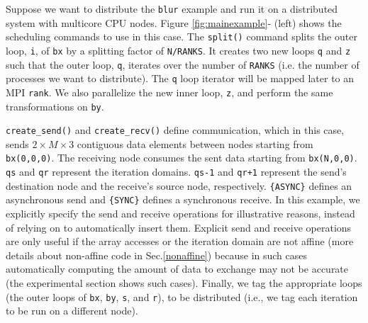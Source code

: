 Suppose we want to distribute the \texttt{blur} example and run it on a distributed system with multicore CPU nodes. Figure \ref{fig:mainexample}-\codethree{} (left) shows the scheduling commands to use in this case. The \texttt{split()} command splits the outer loop, \texttt{i}, of \texttt{bx} by a splitting factor of \texttt{N/RANKS}.  It creates two new loops \texttt{q} and \texttt{z} such that the outer loop, \texttt{q}, iterates over the number of \texttt{RANKS} (i.e. the number of processes we want to distribute).  The \texttt{q} loop iterator will be mapped later to an MPI \texttt{rank}.  We also parallelize the new inner loop, \texttt{z}, and perform the same transformations on \texttt{by}.

\texttt{create\_send()} and \texttt{create\_recv()} define communication, which in this case, sends $2\times M \times3$ contiguous data elements between nodes starting from \texttt{bx(0,0,0)}. The receiving node consumes the sent data starting from \texttt{bx(N,0,0)}. \texttt{qs} and \texttt{qr} represent the iteration domains. \texttt{qs-1} and \texttt{qr+1} represent the send's destination node and the receive's source node, respectively. \texttt{\{ASYNC\}} defines an asynchronous send and \texttt{\{SYNC\}} defines a synchronous receive.
In this example, we explicitly specify the send and receive operations for illustrative reasons, instead of relying on \framework to automatically insert them.
Explicit send and receive operations are only useful if the array accesses or the iteration domain are not affine (more details about non-affine code in Sec.\ref{nonaffine}) because in such cases automatically computing the amount of data to exchange may not be accurate (the experimental section shows such cases).
Finally, we tag the appropriate loops (the outer loops of \texttt{bx}, \texttt{by}, \texttt{s}, and \texttt{r}), to be distributed (i.e., we tag each iteration to be run on a different node).


